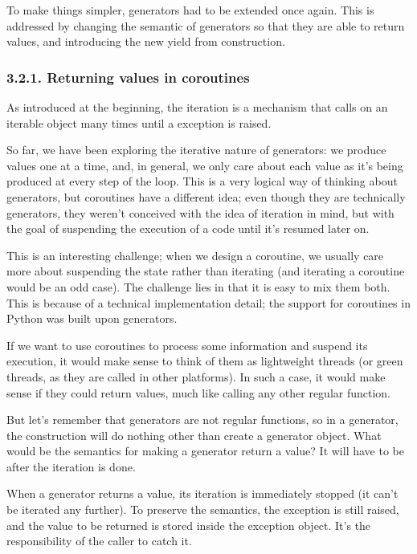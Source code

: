 \documentclass[a4paper,10pt,english]{sphinxmanual}
\begin{document}
To make things simpler, generators had to be extended once again. This is addressed by changing the semantic
of generators so that they are able to return values, and introducing the new yield from construction.


\subsubsection{3.2.1. Returning values in coroutines}
\label{\detokenize{chapters/7_generators/index:returning-values-in-coroutines}}
As introduced at the beginning, the iteration is a mechanism that calls
 on an iterable object many times until a  exception is raised.

So far, we have been exploring the iterative nature of generators: we produce values one at
a time, and, in general, we only care about each value as it’s being produced at every step of
the  loop. This is a very logical way of thinking about generators, but coroutines have a
different idea; even though they are technically generators, they weren’t conceived with the
idea of iteration in mind, but with the goal of suspending the execution of a code until it’s
resumed later on.

This is an interesting challenge; when we design a coroutine, we usually care more about
suspending the state rather than iterating (and iterating a coroutine would be an odd case).
The challenge lies in that it is easy to mix them both. This is because of a technical
implementation detail; the support for coroutines in Python was built upon generators.

If we want to use coroutines to process some information and suspend its execution, it
would make sense to think of them as lightweight threads (or green threads, as they are
called in other platforms). In such a case, it would make sense if they could return values,
much like calling any other regular function.

But let’s remember that generators are not regular functions, so in a generator, the
construction  will do nothing other than create a generator object.
What would be the semantics for making a generator return a value? It will have to be after
the iteration is done.

When a generator returns a value, its iteration is immediately stopped (it can’t be iterated
any further). To preserve the semantics, the  exception is still raised, and
the value to be returned is stored inside the exception object. It’s the responsibility of the
caller to catch it.
\end{document}
